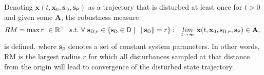    Denoting $\mathbf{x}(t,\mathbf{x}_0,\mathbf{s}_{\mathsf{D}},\mathbf{s}_{\mathsf{P}})$ as a trajectory that is disturbed at least once for $t > 0$ and given some $\mathbf{A}$, the robustness measure
    \begin{gather} \label{eq:8}
        RM = \max r\ \in \mathbb{R}^+ \ \ s.t.\ \forall\ \mathbf{s}_{\mathsf{D},r} \in \{\mathbf{s}_{\mathsf{D}} \in \mathsf{D} \mid\ \ \norm{\mathbf{s}_{\mathsf{D}}} = r\}:\ \ \underset{t \rightarrow \infty}{lim} \ \mathbf{x}(t,\mathbf{x}_0,\mathbf{s}_{\mathsf{D},r},\mathbf{s}_{\mathsf{P}}) \in \mathbf{A},\
    \end{gather}
    is defined, where $\mathbf{s}_{\mathsf{P}}$ denotes a set of constant system parameters.
    In other words, RM is the largest radius $r$ for which all disturbances sampled at that distance from the origin will lead to convergence of the disturbed state trajectory.








